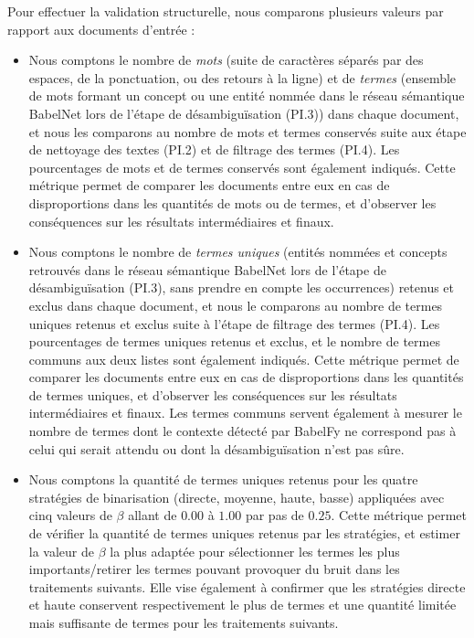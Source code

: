 Pour effectuer la validation structurelle, nous comparons plusieurs valeurs par rapport aux documents d'entrée :
\begin{itemize}
\item Nous comptons le nombre de \textit{mots} (suite de caractères séparés par des espaces, de la ponctuation, ou des retours à la ligne) et de \textit{termes} (ensemble de mots formant un concept ou une entité nommée dans le réseau sémantique BabelNet lors de l'étape de désambiguïsation (PI.3)) dans chaque document, et nous les comparons au nombre de mots et termes conservés suite  aux étape de nettoyage des textes (PI.2) et  de filtrage des termes (PI.4).
Les pourcentages de mots et de termes conservés sont également indiqués.
Cette métrique permet de comparer les documents entre eux en cas de disproportions dans les quantités de mots ou de termes, et d'observer les conséquences sur les résultats intermédiaires et finaux.\\

\item Nous comptons le nombre de \textit{termes uniques} (entités nommées et concepts retrouvés dans le réseau sémantique BabelNet lors de l'étape de désambiguïsation (PI.3), sans prendre en compte les occurrences) retenus et exclus dans chaque document, et nous le comparons au nombre de termes uniques retenus et exclus suite à l'étape de filtrage des termes (PI.4).
Les pourcentages de termes uniques retenus et exclus, et le nombre de termes communs aux deux listes sont également indiqués.
Cette métrique permet de comparer les documents entre eux en cas de disproportions dans les quantités de termes uniques, et d'observer les conséquences sur les résultats intermédiaires et finaux.
Les termes communs servent également à mesurer le nombre de termes dont le contexte détecté par BabelFy ne correspond pas à celui qui serait attendu ou dont la désambiguïsation n'est pas sûre.\\

\item Nous comptons la quantité de termes uniques retenus pour les quatre stratégies de binarisation (directe, moyenne, haute, basse) appliquées avec cinq valeurs de $ \beta $ allant de $ 0.00 $ à $ 1.00 $ par pas de $ 0.25 $.
Cette métrique permet de vérifier la quantité de termes uniques retenus par les stratégies, et estimer la valeur de $ \beta $ la plus adaptée pour sélectionner les termes les plus importants/retirer les termes pouvant provoquer du bruit dans les traitements suivants.
Elle vise également à confirmer que les stratégies directe et haute conservent respectivement le plus de termes et une quantité limitée mais suffisante de termes pour les traitements suivants.\\


\end{itemize}
